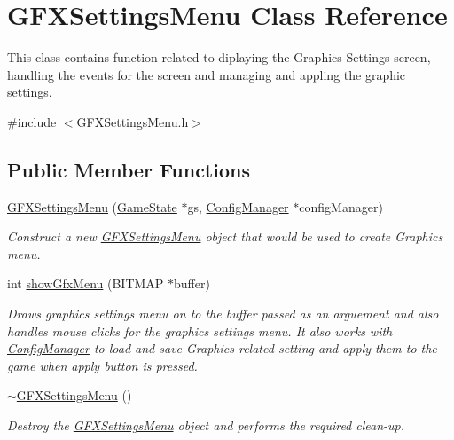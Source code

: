 \hypertarget{class_g_f_x_settings_menu}{}\section{G\+F\+X\+Settings\+Menu Class Reference}
\label{class_g_f_x_settings_menu}


This class contains function related to diplaying the Graphics Settings screen, handling the events for the screen and managing and appling the graphic settings.  




{\ttfamily \#include $<$G\+F\+X\+Settings\+Menu.\+h$>$}

\subsection*{Public Member Functions}
\begin{DoxyCompactItemize}
\item 
\mbox{\hyperlink{class_g_f_x_settings_menu_ac76b53d51d1f1c693684fb25653f6af1}{G\+F\+X\+Settings\+Menu}} (\mbox{\hyperlink{struct_game_state}{Game\+State}} $\ast$gs, \mbox{\hyperlink{class_config_manager}{Config\+Manager}} $\ast$config\+Manager)
\begin{DoxyCompactList}\small\item\em Construct a new \mbox{\hyperlink{class_g_f_x_settings_menu}{G\+F\+X\+Settings\+Menu}} object that would be used to create Graphics menu. \end{DoxyCompactList}\item 
int \mbox{\hyperlink{class_g_f_x_settings_menu_aa2b91fbdb68ec4bf0ed8816ad7b845ad}{show\+Gfx\+Menu}} (B\+I\+T\+M\+AP $\ast$buffer)
\begin{DoxyCompactList}\small\item\em Draws graphics settings menu on to the buffer passed as an arguement and also handles mouse clicks for the graphics settings menu. It also works with \mbox{\hyperlink{class_config_manager}{Config\+Manager}} to load and save Graphics related setting and apply them to the game when apply button is pressed. \end{DoxyCompactList}\item 
\mbox{\hyperlink{class_g_f_x_settings_menu_a59316167f08ca2dc6ca2ebfafec63e2f}{$\sim$\+G\+F\+X\+Settings\+Menu}} ()
\begin{DoxyCompactList}\small\item\em Destroy the \mbox{\hyperlink{class_g_f_x_settings_menu}{G\+F\+X\+Settings\+Menu}} object and performs the required clean-\/up. \end{DoxyCompactList}\end{DoxyCompactItemize}


